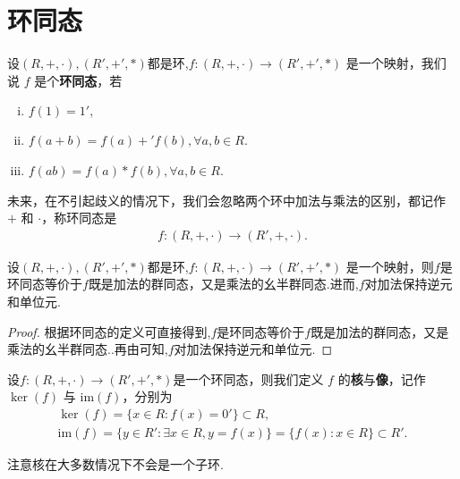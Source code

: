 \documentclass[../../main.tex]{subfiles}
\begin{document}
\section{环同态}

\begin{definition}[环同态]
设$(R, +, \cdot) ,(R', +', *) $都是环,$f : (R, +, \cdot) \to (R', +', *) $ 是一个映射，我们说 $f$ 是个\textbf{环同态}，若
\begin{enumerate}[(i)]
\item $f(1) = 1' ,$

\item $f(a + b) = f(a) +' f(b) ,$$\forall a,b\in R$.

\item $f(ab) = f(a) * f(b) ,$$\forall a,b\in R$.
\end{enumerate}
\end{definition}
\begin{remark}
未来，在不引起歧义的情况下，我们会忽略两个环中加法与乘法的区别，都记作 $+$ 和 $\cdot$，称环同态是
\begin{align*}
f : (R, +, \cdot) \to (R', +, \cdot) .
\end{align*}
\end{remark}

\begin{proposition}\label{proposition:环同态的等价条件}
设$(R, +, \cdot) ,(R', +', *) $都是环,$f : (R, +, \cdot) \to (R', +', *) $ 是一个映射，则$f$是环同态等价于$f$既是加法的群同态，又是乘法的幺半群同态.进而,$f$对加法保持逆元和单位元.
\end{proposition}
\begin{proof}
根据环同态的定义可直接得到,$f$是环同态等价于$f$既是加法的群同态，又是乘法的幺半群同态..再由可知,$f$对加法保持逆元和单位元.
\end{proof}

\begin{definition}[环同态的核与像]
设$f : (R, +, \cdot) \to (R', +', *) $是一个环同态，则我们定义 $f$ 的\textbf{核}与\textbf{像}，记作 $\ker(f)$ 与 $\mathrm{im}(f)$，分别为
\begin{gather*}
\ker(f) = \{x \in R : f(x) = 0'\} \subset R ,\\
\mathrm{im}(f) = \{y \in R' : \exists x \in R, y = f(x)\} = \{f(x) : x \in R\} \subset R'.
\end{gather*}
\end{definition}
\begin{remark}
注意核在大多数情况下不会是一个子环.
\end{remark}
\end{document}
